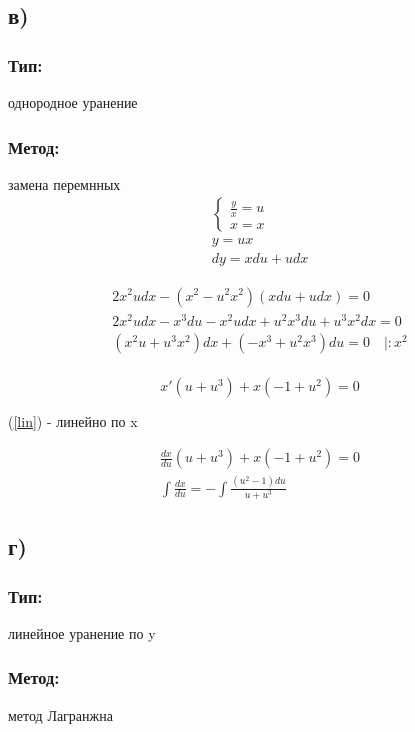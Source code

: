 \documentclass{article}
\begin{document}
\subsection*{в)}
\subsubsection*{Тип:} 
однородное уранение

\subsubsection*{Метод:}
замена перемнных
\begin{gather*}
\begin{cases}
\frac{y}{x}=u \\
x=x
\end{cases}\\
y=ux \\
dy=xdu+udx  
\end{gather*}

\begin{gather*}
    2x^2udx-(x^2-u^2x^2)(xdu+udx)=0 \\
    2x^2udx-x^3du-x^2udx+u^2x^3du+u^3x^2dx=0 \\
    (x^2u+u^3x^2)dx+(-x^3+u^2x^3)du=0 \quad |:x^2 \\
\end{gather*}

\begin{equation}
    x'(u+u^3)+x(-1+u^2)=0 \label{lin}
\end{equation}

(\ref{lin}) - линейно по x

\begin{gather*}
    \frac{dx}{du}(u+u^3)+x(-1+u^2)=0\\
    \int\frac{dx}{du}=-\int\frac{(u^2-1)du}{u+u^3}
\end{gather*}

\subsection*{г)}
\subsubsection*{Тип:} 
линейное уранение по y

\subsubsection*{Метод:}
метод Лагранжна
\end{document}
